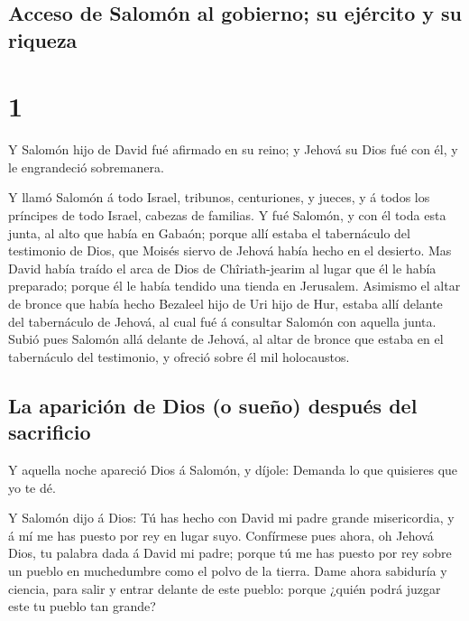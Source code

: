 \hypertarget{acceso-de-salomuxf3n-al-gobierno-su-ejuxe9rcito-y-su-riqueza}{%
\subsection{Acceso de Salomón al gobierno; su ejército y su
riqueza}\label{acceso-de-salomuxf3n-al-gobierno-su-ejuxe9rcito-y-su-riqueza}}

\hypertarget{section-14-1}{%
\section{1}\label{section-14-1}}

 Y Salomón hijo de David fué afirmado en su reino; y
Jehová su Dios fué con él, y le engrandeció sobremanera.

 Y llamó Salomón á todo Israel, tribunos, centuriones, y
jueces, y á todos los príncipes de todo Israel, cabezas de familias.
 Y fué Salomón, y con él toda esta junta, al alto que
había en Gabaón; porque allí estaba el tabernáculo del testimonio de
Dios, que Moisés siervo de Jehová había hecho en el desierto.
 Mas David había traído el arca de Dios de Chîriath-jearim
al lugar que él le había preparado; porque él le había tendido una
tienda en Jerusalem.  Asimismo el altar de bronce que
había hecho Bezaleel hijo de Uri hijo de Hur, estaba allí delante del
tabernáculo de Jehová, al cual fué á consultar Salomón con aquella
junta.  Subió pues Salomón allá delante de Jehová, al
altar de bronce que estaba en el tabernáculo del testimonio, y ofreció
sobre él mil holocaustos.

\hypertarget{la-apariciuxf3n-de-dios-o-sueuxf1o-despuuxe9s-del-sacrificio}{%
\subsection{La aparición de Dios (o sueño) después del
sacrificio}\label{la-apariciuxf3n-de-dios-o-sueuxf1o-despuuxe9s-del-sacrificio}}

 Y aquella noche apareció Dios á Salomón, y díjole:
Demanda lo que quisieres que yo te dé.

 Y Salomón dijo á Dios: Tú has hecho con David mi padre
grande misericordia, y á mí me has puesto por rey en lugar suyo.
 Confírmese pues ahora, oh Jehová Dios, tu palabra dada á
David mi padre; porque tú me has puesto por rey sobre un pueblo en
muchedumbre como el polvo de la tierra.  Dame ahora
sabiduría y ciencia, para salir y entrar delante de este pueblo: porque
¿quién podrá juzgar este tu pueblo tan grande?

